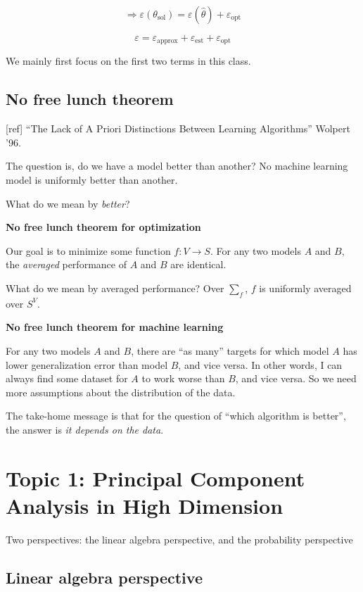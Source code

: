 \documentclass[12pt]{article}
\theoremstyle{plain}
\begin{document}
$$ \Rightarrow \varepsilon(\theta_{\text{sol}}) = \varepsilon(\hat{\theta}) + \varepsilon_\text{opt} $$

$$\varepsilon = \varepsilon_\text{approx} + \varepsilon_\text{est} + \varepsilon_\text{opt} $$

We mainly first focus on the first two terms in this class.

\subsection*{No free lunch theorem}

[ref] ``The Lack of A Priori Distinctions Between Learning Algorithms'' Wolpert '96.

The question is, do we have a model better than another? No machine learning model is uniformly better than another.

What do we mean by \textit{better}?

{\bf No free lunch theorem for optimization}

Our goal is to minimize some function $f : V \rightarrow S $. For any two models $A$ and $B$, the \textit{averaged} performance of $A$ and $B$ are identical.

What do we mean by averaged performance? Over $\sum_f$, $f$ is uniformly averaged over $S^V$.

{\bf No free lunch theorem for machine learning}

For any two models $A$ and $B$, there are ``as many'' targets for which model $A$ has lower generalization error than model $B$, and vice versa. In other words, I can always find some dataset for $A$ to work worse than $B$, and vice versa. So we need more assumptions about the distribution of the data.

The take-home message is that for the question of ``which algorithm is better'', the answer is \textit{it depends on the data}.


\section*{Topic 1: Principal Component Analysis in High Dimension}

Two perspectives: the linear algebra perspective, and the probability perspective

\subsection*{Linear algebra perspective}
\end{document}
